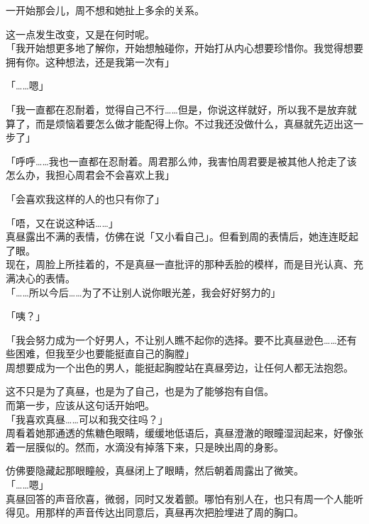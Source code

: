 一开始那会儿，周不想和她扯上多余的关系。

这一点发生改变，又是在何时呢。\\

「我开始想更多地了解你，开始想触碰你，开始打从内心想要珍惜你。我觉得想要拥有你。这种想法，还是我第一次有」

「……嗯」

「我一直都在忍耐着，觉得自己不行……但是，你说这样就好，所以我不是放弃就算了，而是烦恼着要怎么做才能配得上你。不过我还没做什么，真昼就先迈出这一步了」

「呼呼……我也一直都在忍耐着。周君那么帅，我害怕周君要是被其他人抢走了该怎么办，我担心周君会不会喜欢上我」

「会喜欢我这样的人的也只有你了」

「唔，又在说这种话……」\\

真昼露出不满的表情，仿佛在说「又小看自己」。但看到周的表情后，她连连眨起了眼。\\

现在，周脸上所挂着的，不是真昼一直批评的那种丢脸的模样，而是目光认真、充满决心的表情。\\

「……所以今后……为了不让别人说你眼光差，我会好好努力的」

「咦？」

「我会努力成为一个好男人，不让别人瞧不起你的选择。要不比真昼逊色……还有些困难，但我至少也要能挺直自己的胸膛」\\

周想要成为一个出色的男人，能挺起胸膛站在真昼旁边，让任何人都无法抱怨。

这不只是为了真昼，也是为了自己，也是为了能够抱有自信。\\

而第一步，应该从这句话开始吧。\\

「我喜欢真昼……可以和我交往吗？」\\

周看着她那通透的焦糖色眼睛，缓缓地低语后，真昼澄澈的眼瞳湿润起来，好像张着一层膜似的。然而，水滴没有掉落下来，只是映出周的身影。

仿佛要隐藏起那眼瞳般，真昼闭上了眼睛，然后朝着周露出了微笑。\\

「……嗯」\\

真昼回答的声音欣喜，微弱，同时又发着颤。哪怕有别人在，也只有周一个人能听得见。用那样的声音传达出同意后，真昼再次把脸埋进了周的胸口。

